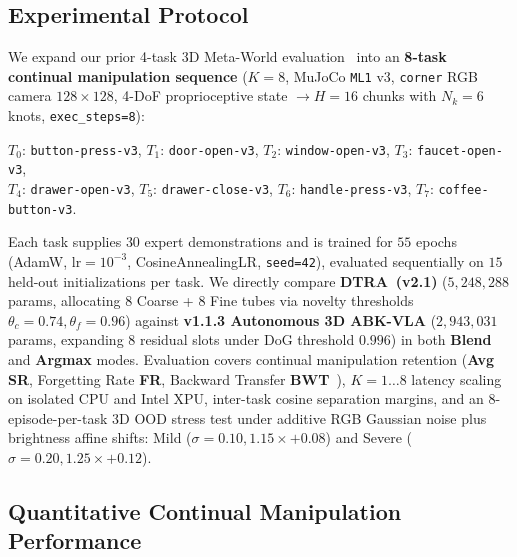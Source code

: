 \documentclass[10pt,twocolumn]{article}
\begin{document}
\subsection{Experimental Protocol}
We expand our prior 4-task 3D Meta-World evaluation~\cite{son2026abkvla} into an \textbf{8-task continual manipulation sequence} ($K=8$, MuJoCo \texttt{ML1} v3, \texttt{corner} RGB camera $128\times 128$, 4-DoF proprioceptive state $\to H=16$ chunks with $N_k=6$ knots, \texttt{exec\_steps=8}):
\begin{center}
  \footnotesize
  $T_0$: \texttt{button-press-v3}, $T_1$: \texttt{door-open-v3}, $T_2$: \texttt{window-open-v3}, $T_3$: \texttt{faucet-open-v3}, \\
  $T_4$: \texttt{drawer-open-v3}, $T_5$: \texttt{drawer-close-v3}, $T_6$: \texttt{handle-press-v3}, $T_7$: \texttt{coffee-button-v3}.
\end{center}
Each task supplies $30$ expert demonstrations and is trained for $55$ epochs (AdamW, $\text{lr}=10^{-3}$, CosineAnnealingLR, \texttt{seed=42}), evaluated sequentially on $15$ held-out initializations per task. We directly compare \textbf{DTRA~(v2.1)} ($5,248,288$ params, allocating $8$ Coarse + $8$ Fine tubes via novelty thresholds $\theta_c=0.74, \theta_f=0.96$) against \textbf{v1.1.3 Autonomous 3D ABK-VLA} ($2,943,031$ params, expanding $8$ residual slots under DoG threshold $0.996$) in both \textbf{Blend} and \textbf{Argmax} modes. Evaluation covers continual manipulation retention (\textbf{Avg SR}, Forgetting Rate \textbf{FR}, Backward Transfer \textbf{BWT}~\cite{lopezpaz2017gem,chaudhry2018riemannian}), $K=1 \dots 8$ latency scaling on isolated CPU and Intel XPU, inter-task cosine separation margins, and an 8-episode-per-task 3D OOD stress test under additive RGB Gaussian noise plus brightness affine shifts: Mild ($\sigma=0.10, 1.15\times + 0.08$) and Severe ($\sigma=0.20, 1.25\times + 0.12$).

\subsection{Quantitative Continual Manipulation Performance}
\end{document}
